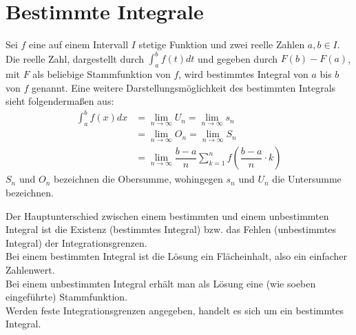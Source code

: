 \section{Bestimmte Integrale}
\begin{Definition}
  Sei $f$ eine auf einem Intervall $I$ stetige Funktion und zwei reelle Zahlen $a,b\in I$. Die reelle Zahl,
  dargestellt durch  $\displaystyle{\int_a^b f(t)dt}$ und gegeben durch $F(b)-F(a)$, mit $F$ als beliebige Stammfunktion von $f$, wird bestimmtes Integral von $a$ bis $b$ von $f$ genannt.
  Eine weitere Darstellungsmöglichkeit des bestimmten Integrals sieht folgendermaßen aus:
  \begin{align*}
    \int_{a}^{b} f(x)dx & = \lim\limits_{n \rightarrow \infty} U_n = \lim\limits_{n \rightarrow \infty} s_n\\
                        & = \lim\limits_{n \rightarrow \infty} O_n = \lim\limits_{n \rightarrow \infty} S_n\\
                        & = \lim\limits_{n \rightarrow \infty} \dfrac{b-a}{n}\sum\limits_{k=1}^{n}f\left(\dfrac{b-a}{n}\cdot k\right)
  \end{align*}
  $S_n$ und $O_n$ bezeichnen die Obersumme, wohingegen $s_n$ und $U_n$ die Untersumme bezeichnen.
\end{Definition}
\begin{Bemerkung}
  Der Hauptunterschied zwischen einem bestimmten und einem unbestimmten Integral ist die Existenz (bestimmtes Integral) bzw. das Fehlen
  (unbestimmtes Integral) der Integrationsgrenzen.\\
  Bei einem bestimmten Integral ist die Lösung ein Flächeinhalt, also ein einfacher Zahlenwert.\\
  Bei einem unbestimmten Integral erhält man als Lösung eine (wie soeben eingeführte) Stammfunktion.\\
  Werden feste Integrationsgrenzen angegeben, handelt es sich um ein bestimmtes Integral.
\end{Bemerkung}
